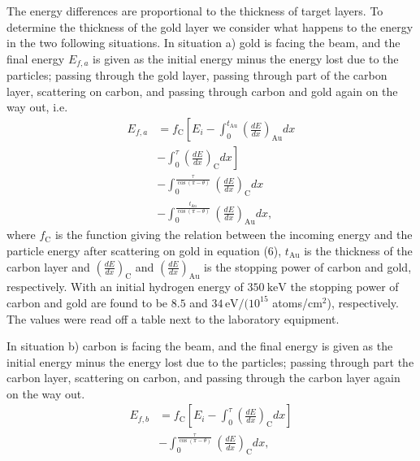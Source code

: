 The energy differences are proportional to the thickness of target layers. To determine the thickness of the gold layer we consider what happens to the energy in the two following situations. In situation a) gold is facing the beam, and the final energy $E_{f,a}$ is given as the initial energy minus the energy lost due to the particles; passing through the gold layer, passing through part of the carbon layer, scattering on carbon, and passing through carbon and gold again on the way out, i.e.
\begin{align}
E_{f,a} &= f_\mathrm{C} \left[ E_i - \int_0^{t_{\mathrm{Au}}}{\left(\frac{dE}{dx}\right)_{\mathrm{Au}}dx} \right. \nonumber 
\\ &- \left. \int_0^{\tau}{\left(\frac{dE}{dx}\right)_{\mathrm{C}}dx} \right] \nonumber
\\ &- \int_0^{\frac{\tau}{\cos(\pi-\theta)}}{\left(\frac{dE}{dx}\right)_{\mathrm{C}}dx} \nonumber
\\ &- \int_0^{\frac{t_\mathrm{Au}}{\cos(\pi-\theta)}}{\left(\frac{dE}{dx}\right)_{\mathrm{Au}}dx}, 
\end{align}
where $f_\mathrm{C}$ is the function giving the relation between the incoming energy and the particle energy after scattering on gold in equation (6), $t_\mathrm{Au}$ is the thickness of the carbon layer and
$\left(\frac{dE}{dx}\right)_\mathrm{C}$ and $\left(\frac{dE}{dx}\right)_\mathrm{Au}$ is the stopping power of carbon and gold, respectively. With an initial hydrogen energy of $\SI{350}{\kilo\electronvolt}$ the
stopping power of carbon and gold are found to be $8.5$ and $34 \,
\si{\electronvolt}/(10^{15}$ atoms/$\si{\centi\metre}^2$), respectively. The
values were read off a table next to the laboratory equipment.

In situation b) carbon is facing the beam, and the final energy is given as the initial energy minus the energy lost due to the particles; passing through part the carbon layer, scattering on carbon, and passing through the carbon layer again on the way out. 
\begin{align}
E_{f,b} &= f_\mathrm{C} \left[ E_i - \int_0^{\tau}{\left(\frac{dE}{dx}\right)_{\mathrm{C}}dx} \right] \nonumber 
\\ &- \int_0^{\frac{\tau}{\cos(\pi-\theta)}}{\left(\frac{dE}{dx}\right)_{\mathrm{C}}dx}, 
\end{align}

